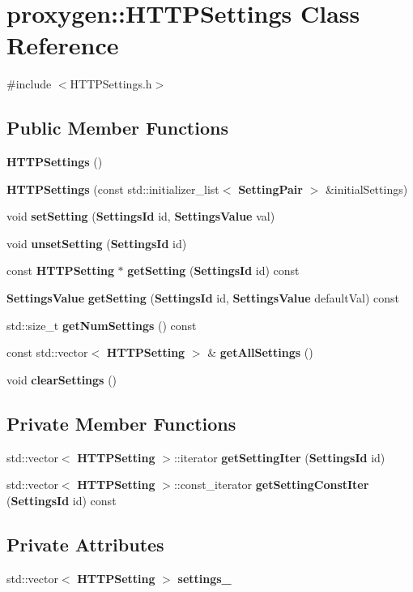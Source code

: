 \section{proxygen\+:\+:H\+T\+T\+P\+Settings Class Reference}
\label{classproxygen_1_1HTTPSettings}


{\ttfamily \#include $<$H\+T\+T\+P\+Settings.\+h$>$}

\subsection*{Public Member Functions}
\begin{DoxyCompactItemize}
\item 
{\bf H\+T\+T\+P\+Settings} ()
\item 
{\bf H\+T\+T\+P\+Settings} (const std\+::initializer\+\_\+list$<$ {\bf Setting\+Pair} $>$ \&initial\+Settings)
\item 
void {\bf set\+Setting} ({\bf Settings\+Id} id, {\bf Settings\+Value} val)
\item 
void {\bf unset\+Setting} ({\bf Settings\+Id} id)
\item 
const {\bf H\+T\+T\+P\+Setting} $\ast$ {\bf get\+Setting} ({\bf Settings\+Id} id) const 
\item 
{\bf Settings\+Value} {\bf get\+Setting} ({\bf Settings\+Id} id, {\bf Settings\+Value} default\+Val) const 
\item 
std\+::size\+\_\+t {\bf get\+Num\+Settings} () const 
\item 
const std\+::vector$<$ {\bf H\+T\+T\+P\+Setting} $>$ \& {\bf get\+All\+Settings} ()
\item 
void {\bf clear\+Settings} ()
\end{DoxyCompactItemize}
\subsection*{Private Member Functions}
\begin{DoxyCompactItemize}
\item 
std\+::vector$<$ {\bf H\+T\+T\+P\+Setting} $>$\+::iterator {\bf get\+Setting\+Iter} ({\bf Settings\+Id} id)
\item 
std\+::vector$<$ {\bf H\+T\+T\+P\+Setting} $>$\+::const\+\_\+iterator {\bf get\+Setting\+Const\+Iter} ({\bf Settings\+Id} id) const 
\end{DoxyCompactItemize}
\subsection*{Private Attributes}
\begin{DoxyCompactItemize}
\item 
std\+::vector$<$ {\bf H\+T\+T\+P\+Setting} $>$ {\bf settings\+\_\+}
\end{DoxyCompactItemize}


